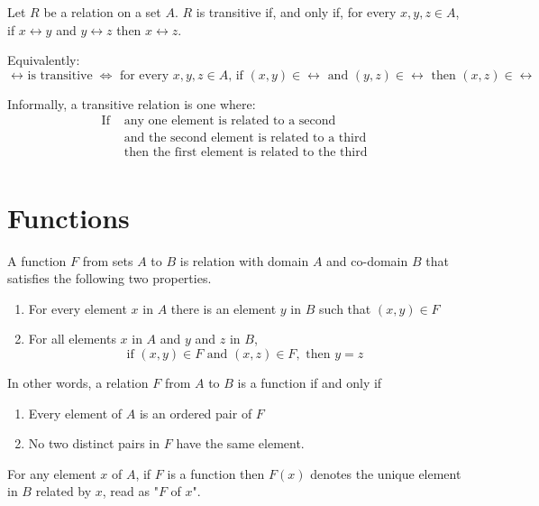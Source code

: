 \documentclass[11pt]{article}
\begin{document}
\begin{definition}[Transitive]\label{def:transitive}
    Let $R$ be a relation on a set $A$.
    \bl
    $R$ is transitive if, and only if, for every $x,y,z \in A$, if $x \rel y$ and $y \rel z$ then $x \rel z$.

    Equivalently:
    \begin{equation*}
        \text{$\rel$ is transitive} \iff \text{ for every $x,y,z \in A$, if $(x,y) \in \rel$ and $(y,z) \in \rel$ then $(x,z) \in \rel$}
    \end{equation*}

    Informally, a transitive relation is one where:
    \begin{align*}
        \text{If } & \text{any one element is related to a second} \\
                   & \text{and the second element is related to a third} \\
                   & \text{then the first element is related to the third} \\
    \end{align*}
\end{definition}

\section{Functions}

\begin{definition}[Function]\label{def:function}
    A function $F$ from sets $A$ to $B$ is relation with domain $A$ and co-domain $B$
    that satisfies the following two properties.
    
    \begin{enumerate}
        \item For every element $x$ in $A$ there is an element $y$ in $B$ such that $(x,y) \in F$
        \item For all elements $x$ in $A$ and $y$ and $z$ in $B$,
            \begin{equation*}
                \text{if } (x,y) \in F \text{ and } (x,z) \in F, \text{ then } y = z
            \end{equation*}
    \end{enumerate}

    In other words, a relation $F$ from $A$ to $B$ is a function if and only if
    \begin{enumerate}
        \item Every element of $A$ is an ordered pair of $F$
        \item No two distinct pairs in $F$ have the same element.
    \end{enumerate}
    
    For any element $x$ of $A$, if $F$ is a function then $F(x)$ denotes
    the unique element in $B$ related by $x$, read as "$F$ of $x$".
\end{definition}
\end{document}
